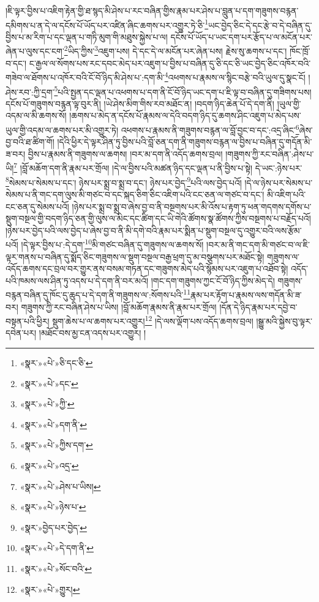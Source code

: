 །ཇི་ལྟར་བྱིས་པ་འཇིག་རྟེན་གྱི་ཐ་སྙད་མི་ཤེས་པ་རང་བཞིན་གྱིས་རྣམ་པར་ཤེས་པ་བླུན་པ་དག་གཟུགས་བརྙན་དམིགས་པ་ན་དེ་ལ་དངོས་པོ་ཡོད་པར་འཛིན་ཞིང་ཆགས་པར་འགྱུར་ཏེ་ཅི་\footnote{«སྣར་»«པེ་»ཅི་དང་ཅི་}ཡང་བྱེད་ཅིང་དེ་དང་རྩེ་བ་དེ་བཞིན་དུ་བྱིས་པ་མ་རིག་པ་དང་ལྡན་པ་གཏི་མུག་གི་མཐུས་སྐྱེས་པ་ལ། དངོས་པོ་ཡོད་པ་ཡང་དག་པར་རྩོད་པ་ལ་མངོན་པར་ཞེན་པ་ལུས་དང་ངག་\footnote{«སྣར་»«པེ་»དང་}ཡིད་ཀྱིས་\footnote{«སྣར་»«པེ་»ཀྱི་}འཇུག་པས། དེ་དང་དེ་ལ་མངོན་པར་ཞེན་པས། རྗེས་སུ་ཆགས་པ་དང་། ཁོང་ཁྲོ་བ་དང་། ང་རྒྱལ་ལ་སོགས་པས་རང་དབང་མེད་པར་འཇུག་པ་བྱིས་པ་བཞིན་དུ་ཅི་དང་ཅི་ཡང་བྱེད་ཅིང་འཁོར་བའི་གཟེབ་ལ་ཐོགས་པ་འཁོར་བའི་ངོ་བོ་ཉིད་མི་ཤེས་པ་:དག་མི་\footnote{«སྣར་»«པེ་»དག་ནི་}འཕགས་པ་རྣམས་ལ་སྙིང་བརྩེ་བའི་ཡུལ་དུ་སྣང་ངོ། །ཤེས་རབ་:ཀྱི་དྲག་\footnote{«སྣར་»«པེ་»ཀྱིས་དག་}པའི་སྤྱན་དང་ལྡན་པ་འཕགས་པ་དག་ནི་ངོ་བོ་ཉིད་ཡང་དག་པ་ཇི་ལྟ་བ་བཞིན་དུ་གཟིགས་པས། དངོས་པོ་གཟུགས་བརྙན་ལྟ་བུར་ནི། །ཡེ་ཤེས་མིག་གིས་རབ་མཐོང་ན། །བདག་ཉིད་ཆེན་པོ་དེ་དག་ནི། །ཡུལ་གྱི་འདམ་ལ་མི་ཆགས་སོ། །ཆགས་པ་མེད་ན་དངོས་པོ་རྣམས་ལ་དེའི་བདག་ཉིད་དུ་ཆགས་ཤིང་འཇུག་པ་མེད་པས་ཡུལ་གྱི་འདམ་ལ་ཆགས་པར་མི་འགྱུར་ཏེ། འཕགས་པ་རྣམས་ནི་གཟུགས་བརྙན་ལ་བློ་བྱང་བ་དང་:འདྲ་ཞིང་\footnote{«སྣར་»«པེ་»འདྲ་}ཞེས་བྱ་བའི་ཐ་ཚིག་གོ། །དེའི་ཕྱིར་དེ་ལྟར་ཤིན་ཏུ་བྱིས་པའི་བློ་ཅན་དག་ནི་གཟུགས་བརྙན་ལ་བྱིས་པ་བཞིན་དུ་གདོན་མི་ཟ་བར། བྱིས་པ་རྣམས་ནི་གཟུགས་ལ་ཆགས། །བར་མ་དག་ནི་འདོད་ཆགས་བྲལ། །གཟུགས་ཀྱི་རང་བཞིན་:ཤེས་པ་ཡི།\footnote{«སྣར་»«པེ་»ཤེས་པ་ཡིས།} །བློ་མཆོག་དག་ནི་རྣམ་པར་གྲོལ། །དེ་ལ་བྱིས་པའི་མཚན་ཉིད་དང་ལྡན་པ་ནི་བྱིས་པ་སྟེ། དེ་ཡང་:ཉེས་པར་\footnote{«སྣར་»«པེ་»ཉེས་པ་}སེམས་པ་སེམས་པ་དང་། ཉེས་པར་སྨྲ་བ་སྨྲ་བ་དང་། ཉེས་པར་བྱེད་\footnote{«སྣར་»བྱེད་པར་བྱེད་}པའི་ལས་བྱེད་པའོ། །དེ་ལ་ཉེས་པར་སེམས་པ་སེམས་པ་ནི་གང་དག་ལུས་མི་གཙང་བ་དང་སྐད་ཅིག་ཅིང་འཇིག་པའི་ངང་ཅན་ལ་གཙང་བ་དང་། མི་འཇིག་པའི་ངང་ཅན་དུ་སེམས་པའོ། །ཉེས་པར་སྨྲ་བ་སྨྲ་བ་ཞེས་བྱ་བ་ནི་བསྔགས་པར་མི་འོས་པ་རྟག་ཏུ་ཕན་གདགས་དགོས་པ་སྡུག་བསྔལ་གྱི་བདག་ཉིད་ཅན་གྱི་ལུས་ལ་མིང་དང་ཚིག་དང་ཡི་གེའི་ཚོགས་སྣ་ཚོགས་ཀྱིས་བསྔགས་པ་བརྗོད་པའོ། །ཉེས་པར་བྱེད་པའི་ལས་བྱེད་པ་ཞེས་བྱ་བ་ནི་མི་དགེ་བའི་རྣམ་པར་སྨིན་པ་སྡུག་བསྔལ་དུ་འགྱུར་བའི་ལས་རྩོམ་པའོ། །དེ་ལྟར་བྱིས་པ་:དེ་དག་\footnote{«སྣར་»«པེ་»དེ་དག་ནི་}མི་གཙང་བཞིན་དུ་གཟུགས་ལ་ཆགས་སོ། །བར་མ་ནི་གང་དག་མི་གཙང་བ་ལ་ཇི་ལྟར་གནས་པ་བཞིན་དུ་སྨོད་ཅིང་གཟུགས་ལ་སྡུག་བསྔལ་བརྒྱ་ཕྲག་དུ་མ་བསྩགས་པར་མཐོང་སྟེ། གཟུགས་ལ་འདོད་ཆགས་དང་བྲལ་བར་གྱུར་ནས་བསམ་གཏན་དང་གཟུགས་མེད་པའི་སྙོམས་པར་འཇུག་པ་འཐོབ་སྟེ། འདོད་པའི་ཁམས་ལས་ཤིན་ཏུ་འདས་པ་དེ་དག་ནི་བར་མའོ། །གང་དག་གཟུགས་ཀྱང་ངོ་བོ་ཉིད་ཀྱིས་མེད་དེ། གཟུགས་བརྙན་བཞིན་དུ་ཁོང་དུ་ཆུད་པ་དེ་དག་ནི་གཟུགས་ལ་:སོགས་པའི་\footnote{«སྣར་»«པེ་»སོང་བའི་}རྣམ་པར་རྟོག་པ་རྣམས་ལས་གདོན་མི་ཟ་བར། གཟུགས་ཀྱི་རང་བཞིན་ཤེས་པ་ཡིས། །བློ་མཆོག་རྣམས་ནི་རྣམ་པར་གྲོལ། །དོན་དེ་ཉིད་རྣམ་པར་དབྱེ་བ་བསྟན་པའི་ཕྱིར། སྡུག་ཆེས་པ་ལ་ཆགས་པར་འགྱུར།\footnote{«སྣར་»«པེ་»གྱུར།} །དེ་ལས་ལྡོག་པས་འདོད་ཆགས་བྲལ། །སྒྱུ་མའི་སྐྱེས་བུ་ལྟར་དབེན་པར། །མཐོང་བས་མྱ་ངན་འདས་པར་འགྱུར། །

